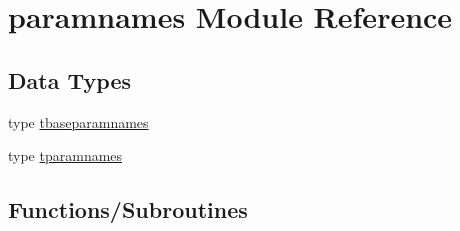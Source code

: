 \hypertarget{namespaceparamnames}{}\section{paramnames Module Reference}
\label{namespaceparamnames}
\subsection*{Data Types}
\begin{DoxyCompactItemize}
\item 
type \mbox{\hyperlink{structparamnames_1_1tbaseparamnames}{tbaseparamnames}}
\item 
type \mbox{\hyperlink{structparamnames_1_1tparamnames}{tparamnames}}
\end{DoxyCompactItemize}
\subsection*{Functions/\+Subroutines}

